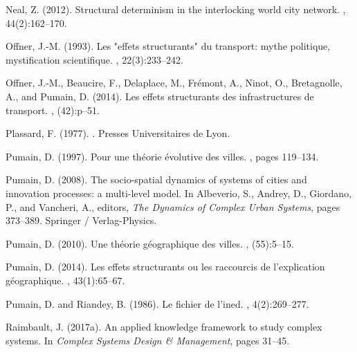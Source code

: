 \documentclass[11pt]{article}
\begin{document}
\begin{thebibliography}{}
Neal, Z. (2012).
\newblock Structural determinism in the interlocking world city network.
, 44(2):162--170.

Offner, J.-M. (1993).
\newblock Les "effets structurants" du transport: mythe politique,
  mystification scientifique.
, 22(3):233--242.

Offner, J.-M., Beaucire, F., Delaplace, M., Fr{\'e}mont, A., Ninot, O.,
  Bretagnolle, A., and Pumain, D. (2014).
\newblock Les effets structurants des infrastructures de transport.
, (42):p--51.

Plassard, F. (1977).
.
\newblock Presses Universitaires de Lyon.

Pumain, D. (1997).
\newblock Pour une th{\'e}orie {\'e}volutive des villes.
, pages 119--134.

Pumain, D. (2008).
\newblock The socio-spatial dynamics of systems of cities and innovation
  processes: a multi-level model.
\newblock In Albeverio, S., Andrey, D., Giordano, P., and Vancheri, A.,
  editors, {\em The Dynamics of Complex Urban Systems}, pages 373--389.
  Springer / Verlag-Physics.

Pumain, D. (2010).
\newblock Une th{\'e}orie g{\'e}ographique des villes.
,
  (55):5--15.

Pumain, D. (2014).
\newblock Les effets structurants ou les raccourcis de l'explication
  g{\'e}ographique.
, 43(1):65--67.

Pumain, D. and Riandey, B. (1986).
\newblock Le fichier de l'ined.
, 4(2):269--277.

Raimbault, J. (2017a).
\newblock An applied knowledge framework to study complex systems.
\newblock In {\em Complex Systems Design \& Management}, pages 31--45.


\end{thebibliography}
\end{document}
